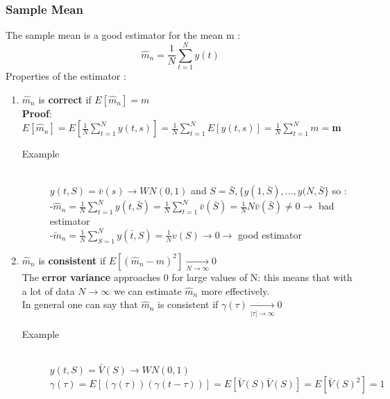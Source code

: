 \subsubsection{Sample Mean}
The sample mean is a good estimator for the mean m : $$ \hat{m}_n = \frac{1}{N} \sum\limits_{t=1}^N y(t) $$
Properties of the estimator : 
\begin{enumerate}
\item $ \hat{m}_n $ is \textbf{correct} if $ E[\hat{m}_n] = m $\\
\textbf{Proof}: $ E[\hat{m}_n] = E[\frac{1}{N} \sum\limits_{t=1}^N y(t,s)] = 
\frac{1}{N} \sum\limits_{t=1}^NE[y(t,s)] = \frac{1}{N} \sum\limits_{t=1}^N m =$\textbf{m} 
\begin{description}
\item[Example]\hfill \\
$y(t,S) = \bar{v}(s) \rightarrow WN(0,1) $ and $ S = \bar{S} , \{ y(1,\bar{S}),...,y(N,\bar{S} \}$ so :\\ 
-$ \hat{m}_n = \frac{1}{N} \sum\limits_{t=1}^N y(t,\bar{S}) = \frac{1}{N} \sum\limits_{t=1}^N \bar{v}(\bar{S}) = \frac{1}{N} N \bar{v}(\bar{S}) \neq 0 \rightarrow$ bad estimator\\
-$ \breve{m}_n = \frac{1}{N} \sum\limits_{S=1}^N y(\bar{t},S) = \frac{1}{N} v(S) \to  0 \rightarrow$ good estimator \\
\end{description}
\item $ \hat{m}_n $ is \textbf{consistent} if $ E[(\hat{m}_n - m )^2] \xrightarrow[N \to \infty] {} 0 $ \\ The \textbf{error variance} approaches 0 for large values of N: this means that with a lot of data $N \to \infty$ we can estimate $\hat{m}_n$ more effectively. 
\\In general one can say that  $\hat{m}_n$ is consistent if  $\gamma(\tau) \xrightarrow[|\tau| \to \infty] {} 0$
\begin{description}
\item[Example]\hfill \\
$ y(t,S) = \bar{V}(S) \to WN(0,1) $ \\ $ \gamma(\tau)=  E[(\gamma(\tau))(\gamma(t-\tau))] = E[ \bar{V}(S) \bar{V}(S)] = E[\bar{V}(S)^2] = 1 $ 
\end{description}
\end{enumerate}

